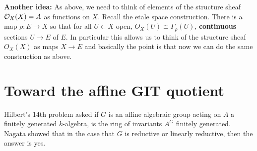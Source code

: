 \documentclass[12pt]{article}
\begin{document}
\hfill

\textbf{Another idea:
}
As above, we need to think of elements of the structure sheaf $\mathcal{O}_X(X) = A$ as functions on $X$. Recall the etale space construction. There is a map $\rho:E\to X$ so that for all $U\subset X$ open, $O_X(U)\cong \Gamma_\rho(U)$, \textbf{continuous} sections $U\to E$ of $E$. In particular this allows us to think of the structure sheaf $O_X(X)$ as maps $X\to E$ and basically the point is that now we can do the same construction as above. 

\section{Toward the affine GIT quotient}
Hilbert's 14th problem asked if $G$ is an affine algebraic group acting on $A$ a finitely generated $k$-algebra, is the ring of invariants $A^G$ finitely generated. Nagata showed that in the case that $G$ is reductive or linearly reductive, then the answer is yes. 
\end{document}
